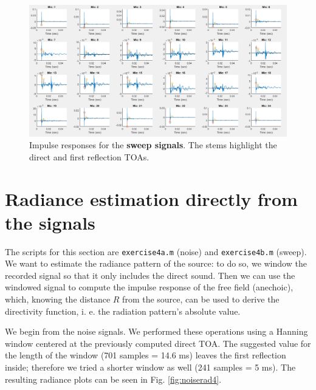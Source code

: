 \documentclass[a4paper]{article}
\begin{document}
\begin{figure}[h]
	\centering
	\includegraphics[width=0.85\linewidth]{sweep_ir.png}
	\caption{Impulse responses for the \textbf{sweep signals}. The stems highlight the direct and first reflection TOAs.}
	\label{fig:sweepir}
\end{figure}


\section{Radiance estimation directly from the signals}
The scripts for this section are \verb|exercise4a.m| (noise) and \verb|exercise4b.m| (sweep). We want to estimate the radiance pattern of the source: to do so, we window the recorded signal so that it only includes the direct sound. Then we can use the windowed signal to compute the impulse response of the free field (anechoic), which, knowing the distance $R$ from the source, can be used to derive the directivity function, i. e. the radiation pattern's absolute value.

We begin from the noise signals. We performed these operations using a Hanning window centered at the previously computed direct TOA. The suggested value for the length of the window (701 samples = 14.6 ms) leaves the first reflection inside; therefore we tried a shorter window as well (241 samples = 5 ms). The resulting radiance plots can be seen in Fig. \ref{fig:noiserad4}.
\end{document}
